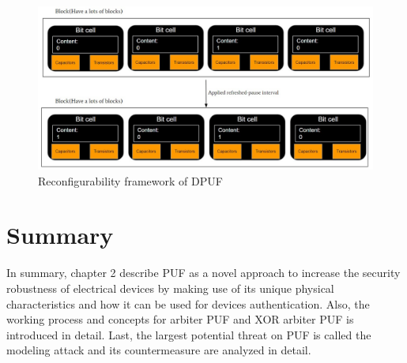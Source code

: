 \begin{figure}[htp]
    \centering
    \includegraphics[width=18cm]{figures/figure9.jpg}
    \caption{Reconfigurability framework of DPUF}
    \label{fig:figure9}
    \end{figure}

\section{Summary}
In summary, chapter 2 describe PUF as a novel approach to increase the security robustness of electrical devices by making use of its unique physical characteristics and how it can be used
for devices authentication. Also, the working process and concepts for arbiter PUF and XOR arbiter PUF is introduced in detail. Last, the largest potential threat on PUF is called the modeling attack 
and its countermeasure are analyzed in detail.


